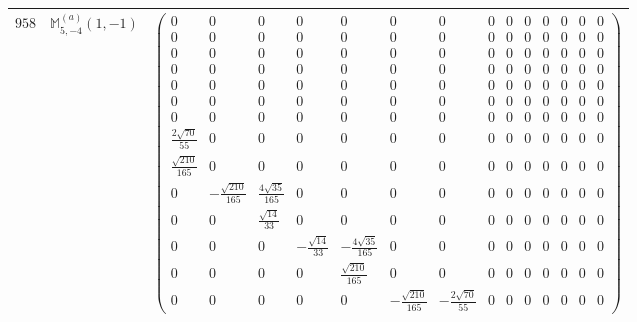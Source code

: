 \documentclass[fleqn,8pt,landscape]{jsarticle}
\begin{document}
\begin{center}
\begin{longtable}{ccc}
$ 958 $ & $ \mathbb{M}_{5,-4}^{(a)}(1,-1) $ & $ \begin{pmatrix} 0 & 0 & 0 & 0 & 0 & 0 & 0 & 0 & 0 & 0 & 0 & 0 & 0 & 0 \\ 0 & 0 & 0 & 0 & 0 & 0 & 0 & 0 & 0 & 0 & 0 & 0 & 0 & 0 \\ 0 & 0 & 0 & 0 & 0 & 0 & 0 & 0 & 0 & 0 & 0 & 0 & 0 & 0 \\ 0 & 0 & 0 & 0 & 0 & 0 & 0 & 0 & 0 & 0 & 0 & 0 & 0 & 0 \\ 0 & 0 & 0 & 0 & 0 & 0 & 0 & 0 & 0 & 0 & 0 & 0 & 0 & 0 \\ 0 & 0 & 0 & 0 & 0 & 0 & 0 & 0 & 0 & 0 & 0 & 0 & 0 & 0 \\ 0 & 0 & 0 & 0 & 0 & 0 & 0 & 0 & 0 & 0 & 0 & 0 & 0 & 0 \\ \frac{2 \sqrt{70}}{55} & 0 & 0 & 0 & 0 & 0 & 0 & 0 & 0 & 0 & 0 & 0 & 0 & 0 \\ \frac{\sqrt{210}}{165} & 0 & 0 & 0 & 0 & 0 & 0 & 0 & 0 & 0 & 0 & 0 & 0 & 0 \\ 0 & - \frac{\sqrt{210}}{165} & \frac{4 \sqrt{35}}{165} & 0 & 0 & 0 & 0 & 0 & 0 & 0 & 0 & 0 & 0 & 0 \\ 0 & 0 & \frac{\sqrt{14}}{33} & 0 & 0 & 0 & 0 & 0 & 0 & 0 & 0 & 0 & 0 & 0 \\ 0 & 0 & 0 & - \frac{\sqrt{14}}{33} & - \frac{4 \sqrt{35}}{165} & 0 & 0 & 0 & 0 & 0 & 0 & 0 & 0 & 0 \\ 0 & 0 & 0 & 0 & \frac{\sqrt{210}}{165} & 0 & 0 & 0 & 0 & 0 & 0 & 0 & 0 & 0 \\ 0 & 0 & 0 & 0 & 0 & - \frac{\sqrt{210}}{165} & - \frac{2 \sqrt{70}}{55} & 0 & 0 & 0 & 0 & 0 & 0 & 0 \end{pmatrix} $ \\ \hline

\end{longtable}
\end{center}
\end{document}
